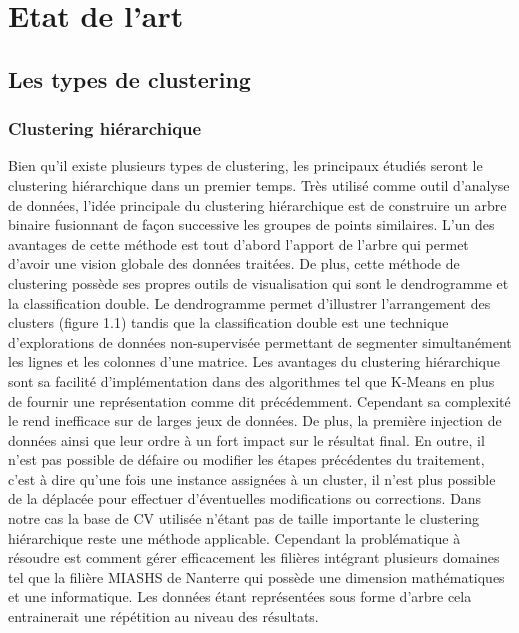 \documentclass[memoire.tex]{subfiles}
\begin{document}
\newpage
\chapter{Etat de l'art}
\section{Les types de clustering}
\subsection{Clustering hiérarchique}
Bien qu'il existe plusieurs types de clustering, les principaux étudiés seront le clustering hiérarchique dans un premier temps. Très utilisé comme outil d'analyse de données, l'idée principale du clustering hiérarchique est de construire un arbre binaire fusionnant de façon successive les groupes de points similaires. L'un des avantages de cette méthode est tout d'abord l'apport de l'arbre qui permet d'avoir une vision globale des données traitées. De plus, cette méthode de clustering possède ses propres outils de visualisation qui sont le dendrogramme et la classification double. Le dendrogramme permet d'illustrer l'arrangement des clusters (figure 1.1)  tandis que la classification double est une technique d'explorations de données non-supervisée permettant de segmenter simultanément les lignes et les colonnes d'une matrice. Les avantages du clustering hiérarchique sont sa facilité d'implémentation dans des algorithmes tel que K-Means en plus de fournir une représentation comme dit précédemment. Cependant sa complexité le rend inefficace sur de larges jeux de données. De plus, la première injection de données ainsi que leur  ordre à un fort impact sur le résultat final. En outre, il n'est pas possible de défaire ou modifier les étapes précédentes du traitement, c'est à dire qu'une fois une instance assignées à un cluster, il n'est plus possible de la déplacée pour effectuer d'éventuelles modifications ou corrections. Dans notre cas la base de CV utilisée n'étant pas de taille importante le clustering hiérarchique reste une méthode applicable. Cependant la problématique à résoudre est comment gérer efficacement les filières intégrant plusieurs domaines tel que la filière MIASHS de Nanterre qui possède une dimension mathématiques et une informatique. Les données étant représentées sous forme d'arbre cela entrainerait une répétition au niveau des résultats.
\end{document}
